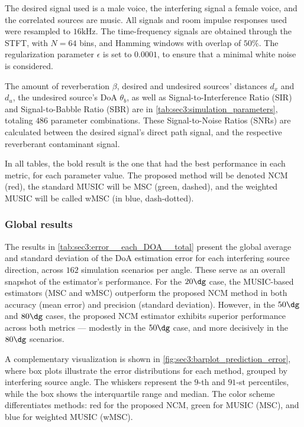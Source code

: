 The desired signal used is a male voice, the interfering signal a female voice, and the correlated sources are music. All signals and room impulse responses used were resampled to $16\si{\kilo\hertz}$. The time-frequency signals are obtained through the STFT, with $N = 64$ bins, and Hamming windows with overlap of $50\%$. The regularization parameter $\epsilon$ is set to $0.0001$, to ensure that a minimal white noise is considered. 

The amount of reverberation $\beta$, desired and undesired sources' distances $d_x$ and $d_u$, the undesired source's DoA $\theta_b$, as well as Signal-to-Interference Ratio (SIR) and Signal-to-Babble Ratio (SBR) are in \cref{tab:sec3:simulation_parameters}, totaling $486$ parameter combinations. These Signal-to-Noise Ratios (SNRs) are calculated between the desired signal's direct path signal, and the respective reverberant contaminant signal.



In all tables, the bold result is the one that had the best performance in each metric, for each parameter value. The proposed method will be denoted NCM (red), the standard MUSIC will be MSC (green, dashed), and the weighted MUSIC will be called wMSC (in blue, dash-dotted).

\subsubsection*{Global results}



The results in \cref{tab:sec3:error__each_DOA__total} present the global average and standard deviation of the DoA estimation error for each interfering source direction, across $162$ simulation scenarios per angle. These serve as an overall snapshot of the estimator’s performance. For the $20\dg$ case, the MUSIC-based estimators (MSC and wMSC) outperform the proposed NCM method in both accuracy (mean error) and precision (standard deviation). However, in the $50\dg$ and $80\dg$ cases, the proposed NCM estimator exhibits superior performance across both metrics — modestly in the $50\dg$ case, and more decisively in the $80\dg$ scenarios.



A complementary visualization is shown in \cref{fig:sec3:barplot_prediction_error}, where box plots illustrate the error distributions for each method, grouped by interfering source angle. The whiskers represent the $9$-th and $91$-st percentiles, while the box shows the interquartile range and median. The color scheme differentiates methods: red for the proposed NCM, green for MUSIC (MSC), and blue for weighted MUSIC (wMSC).

